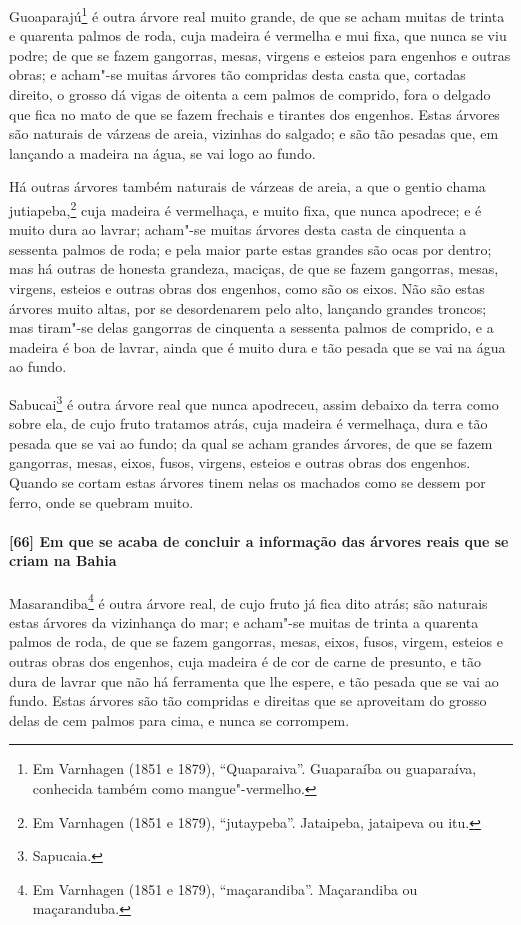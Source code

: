 \begin{linenumbers}
Guoaparajú\footnote{ Em Varnhagen (1851 e 1879), ``Quaparaiva''. Guaparaíba ou guaparaíva,
conhecida também como mangue"-vermelho.} é outra árvore real muito grande, de que se acham
muitas de trinta e quarenta palmos de roda, cuja madeira é vermelha e mui fixa, que nunca
se viu podre; de que se fazem gangorras, mesas, virgens e esteios para engenhos e outras
obras; e acham"-se muitas árvores tão compridas desta casta que, cortadas direito, o grosso
dá vigas de oitenta a cem palmos de comprido, fora o delgado que fica no mato de que se
fazem frechais e tirantes dos engenhos. Estas árvores são naturais de várzeas de areia,
vizinhas do salgado; e são tão pesadas que, em lançando a madeira na água, se vai logo ao
fundo.

Há outras árvores também naturais de várzeas de areia, a que o gentio chama
jutiapeba,\footnote{ Em Varnhagen (1851 e 1879), ``jutaypeba''. Jataipeba, jataipeva ou
itu.} cuja madeira é vermelhaça, e muito fixa, que nunca apodrece; e é muito dura ao
lavrar; acham"-se muitas árvores desta casta de cinquenta a sessenta palmos de roda; e pela
maior parte estas grandes são ocas por dentro; mas há outras de honesta grandeza, maciças,
de que se fazem gangorras, mesas, virgens, esteios e outras obras dos engenhos, como são
os eixos. Não são estas árvores muito altas, por se desordenarem pelo alto, lançando
grandes troncos; mas tiram"-se delas gangorras de cinquenta a sessenta palmos de comprido,
e a madeira é boa de lavrar, ainda que é muito dura e tão pesada que se vai na água ao
fundo.

Sabucai\footnote{ Sapucaia.} é outra árvore real que nunca apodreceu, assim debaixo da
terra como sobre ela, de cujo fruto tratamos atrás, cuja madeira é vermelhaça, dura e tão
pesada que se vai ao fundo; da qual se acham grandes árvores, de que se fazem gangorras,
mesas, eixos, fusos, virgens, esteios e outras obras dos engenhos. Quando se cortam estas
árvores tinem nelas os machados como se dessem por ferro, onde se quebram muito.

\paragraph{[66] Em que se acaba de concluir a informação das árvores reais que se criam na
Bahia}\quad
Masarandiba\footnote{ Em Varnhagen (1851 e 1879), ``maçarandiba''. Maçarandiba ou
maçaranduba.} é outra árvore real, de cujo fruto já fica dito atrás; são naturais estas
árvores da vizinhança do mar; e acham"-se muitas de trinta a quarenta palmos de roda, de
que se fazem gangorras, mesas, eixos, fusos, virgem, esteios e outras obras dos engenhos,
cuja madeira é de cor de carne de presunto, e tão dura de lavrar que não há ferramenta que
lhe espere, e tão pesada que se vai ao fundo. Estas árvores são tão compridas e direitas
que se aproveitam do grosso delas de cem palmos para cima, e nunca se corrompem.


\end{linenumbers}
